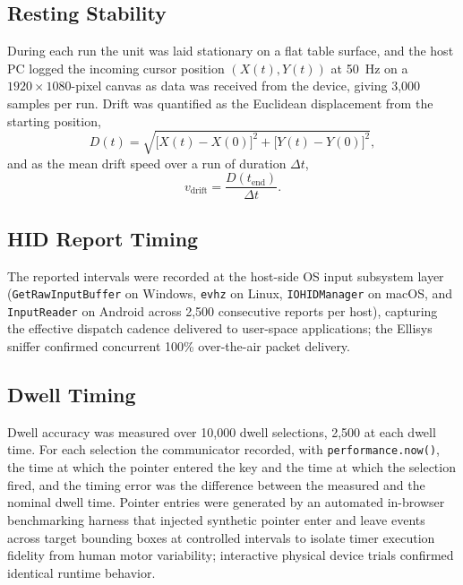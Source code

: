 \documentclass[journal]{IEEEtran}
\begin{document}
\subsection{Resting Stability}
During each run the unit was laid stationary on a flat table surface, and the host PC logged the incoming cursor position $(X(t),Y(t))$ at 50~Hz on a $1920\times1080$-pixel canvas as data was received from the device, giving 3,000 samples per run. Drift was quantified as the Euclidean displacement from the starting position,
\begin{equation}
D(t)=\sqrt{\big[X(t)-X(0)\big]^2+\big[Y(t)-Y(0)\big]^2},
\label{eq:drift}
\end{equation}
and as the mean drift speed over a run of duration $\Delta t$,
\begin{equation}
v_{\mathrm{drift}}=\frac{D(t_{\mathrm{end}})}{\Delta t}.
\label{eq:vdrift}
\end{equation}

\subsection{HID Report Timing}
The reported intervals were recorded at the host-side OS input subsystem layer (\texttt{GetRawInputBuffer} on Windows, \texttt{evhz} on Linux, \texttt{IOHIDManager} on macOS, and \texttt{InputReader} on Android across 2,500 consecutive reports per host), capturing the effective dispatch cadence delivered to user-space applications; the Ellisys sniffer confirmed concurrent 100\% over-the-air packet delivery.

\subsection{Dwell Timing}
Dwell accuracy was measured over 10,000 dwell selections, 2,500 at each dwell time. For each selection the communicator recorded, with \texttt{performance.now()}, the time at which the pointer entered the key and the time at which the selection fired, and the timing error was the difference between the measured and the nominal dwell time. Pointer entries were generated by an automated in-browser benchmarking harness that injected synthetic pointer enter and leave events across target bounding boxes at controlled intervals to isolate timer execution fidelity from human motor variability; interactive physical device trials confirmed identical runtime behavior.
\end{document}

